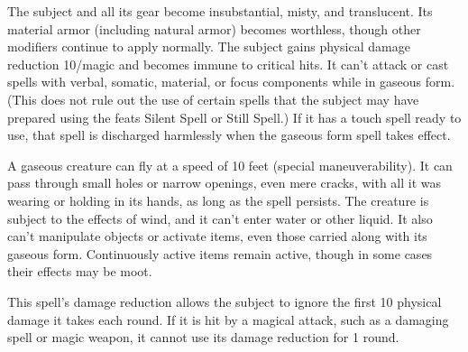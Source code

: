 \begin{comment}
\subsubsection{G}
\end{comment}

\spellrng{\rngtouch}
\begin{spelleffect}
  The subject and all its gear become insubstantial, misty, and translucent. Its material armor (including natural armor) becomes worthless, though other modifiers continue to apply normally. The subject gains physical damage reduction 10/magic and becomes immune to critical hits. It can't attack or cast spells with verbal, somatic, material, or focus components while in gaseous form. (This does not rule out the use of certain spells that the subject may have prepared using the feats Silent Spell or Still Spell.) If it has a touch spell ready to use, that spell is discharged harmlessly when the gaseous form spell takes effect.
  \par A gaseous creature can fly at a speed of 10 feet (special maneuverability). It can pass through small holes or narrow openings, even mere cracks, with all it was wearing or holding in its hands, as long as the spell persists. The creature is subject to the effects of wind, and it can't enter water or other liquid. It also can't manipulate objects or activate items, even those carried along with its gaseous form. Continuously active items remain active, though in some cases their effects may be moot.
\end{spelleffect}
\begin{spellnotes}
  This spell's damage reduction allows the subject to ignore the first 10 physical damage it takes each round. If it is hit by a magical attack, such as a damaging spell or magic weapon, it cannot use its damage reduction for 1 round.
\end{spellnotes}

